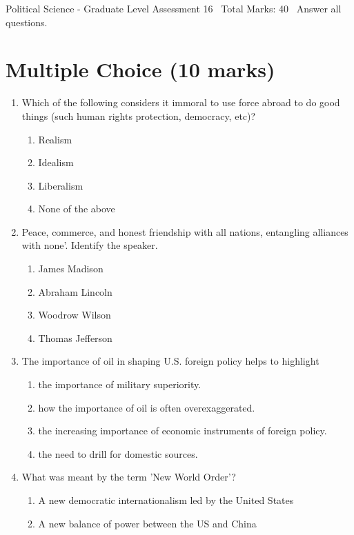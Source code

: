 \documentclass[12pt]{article}
\begin{document}
\begin{center}
Political Science - Graduate Level Assessment 16 \
Total Marks: 40 \
Answer all questions.
\end{center}

\section*{Multiple Choice (10 marks)}
\begin{enumerate}[label=\arabic*.]
\item Which of the following considers it immoral to use force abroad to do good things (such human rights protection, democracy, etc)?
\begin{enumerate}[label=(\alph*)]
    \item Realism
    \item Idealism
    \item Liberalism
    \item None of the above
\end{enumerate}
\item Peace, commerce, and honest friendship with all nations, entangling alliances with none'. Identify the speaker.
\begin{enumerate}[label=(\alph*)]
    \item James Madison
    \item Abraham Lincoln
    \item Woodrow Wilson
    \item Thomas Jefferson
\end{enumerate}
\item The importance of oil in shaping U.S. foreign policy helps to highlight
\begin{enumerate}[label=(\alph*)]
    \item the importance of military superiority.
    \item how the importance of oil is often overexaggerated.
    \item the increasing importance of economic instruments of foreign policy.
    \item the need to drill for domestic sources.
\end{enumerate}
\item What was meant by the term 'New World Order'?
\begin{enumerate}[label=(\alph*)]
    \item A new democratic internationalism led by the United States
    \item A new balance of power between the US and China

\end{enumerate}
\end{enumerate}
\end{document}
